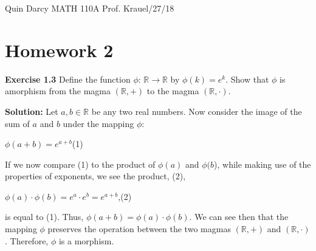 \documentclass[12pt, a4paper]{article}
\begin{document}
\begin{flushleft}
Quin Darcy\linebreak
MATH 110A\linebreak
Prof. Krauel/27/18\linebreak
\hfill
\end{flushleft}

\section*{\hfil\hfil Homework 2\hfil}
\hfil


\begin{flushleft}
\hfil\textbf{Exercise 1.3} Define the function $\phi$: $\mathbb{R}\rightarrow\mathbb{R}$ by $\phi(k)=e^k$. Show that $\phi$ is a\linebreak morphism from the magma $(\mathbb{R}, +)$ to the magma $(\mathbb{R}, \cdot)$.



\end{flushleft}

\begin{flushleft}
\textbf{Solution:}  Let $a,b\in\mathbb{R}$ be any two real numbers. Now consider the image of the sum of $a$ and $b$ under the mapping $\phi$:\linebreak
\hfil
\hfil
\end{flushleft}

\begin{flushright}\hfil\hfil\hfil$\phi(a+b)=e^{a+b}$\hfil\hfil\hfil\hfil(1)\linebreak\end{flushright}

\begin{flushleft}If we now compare (1) to the product of $\phi(a)$ and $\phi(b$), while making use of the properties of exponents, we see the product, (2),\linebreak
\hfil
\hfil
\hfil
\end{flushleft}

\begin{flushright}\hfil\hfil$\phi(a)\cdot\phi(b)=e^a\cdot e^b=e^{a+b}$,\hfil\hfil\hfil(2)\linebreak\end{flushright}

\begin{flushleft}
is equal to (1). Thus, $\phi(a+b)=\phi(a)\cdot \phi(b)$. We can see then that the mapping $\phi$ preserves the operation between the two magmas $(\mathbb{R}, +)$ and $(\mathbb{R}, \cdot)$. Therefore, $\phi$ is a morphism.\linebreak
\hfil
\hfil
\hfil 
\hfil
\end{flushleft}
\end{document}
